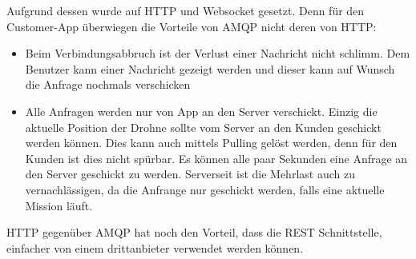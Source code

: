 Aufgrund dessen wurde auf HTTP und Websocket gesetzt.
Denn für den Customer-App überwiegen die Vorteile von AMQP nicht deren von HTTP:
\begin{itemize}
	\item{
		Beim Verbindungsabbruch ist der Verlust einer Nachricht nicht schlimm.
		Dem Benutzer kann einer Nachricht gezeigt werden und dieser kann auf Wunsch die Anfrage nochmals verschicken}
	\item{
		Alle Anfragen werden nur von App an den Server verschickt.
		Einzig die aktuelle Position der Drohne sollte vom Server an den Kunden geschickt werden können.
		Dies kann auch mittels Pulling gelöst werden, denn für den Kunden ist dies nicht spürbar.
		Es können alle paar Sekunden eine Anfrage an den Server geschickt zu werden.
		Serverseit ist die Mehrlast auch zu vernachlässigen, da die Anfrange nur geschickt werden,
		falls eine aktuelle Mission läuft.
	}
\end{itemize}

HTTP gegenüber AMQP hat noch den Vorteil, dass die REST Schnittstelle, einfacher von einem drittanbieter verwendet werden können.

